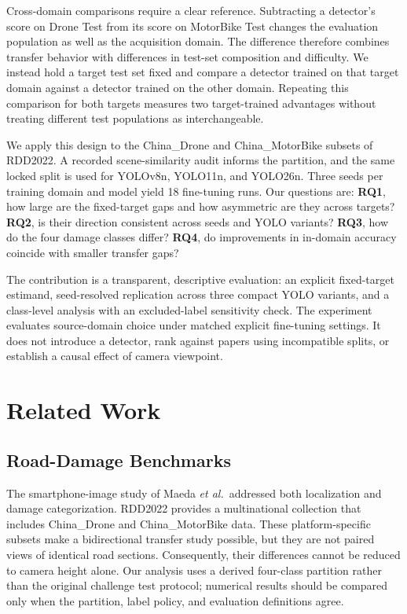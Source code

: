 \documentclass[conference,a4paper]{IEEEtran}
\begin{document}
Cross-domain comparisons require a clear reference. Subtracting a detector's score on Drone Test from its score on MotorBike Test changes the evaluation population as well as the acquisition domain. The difference therefore combines transfer behavior with differences in test-set composition and difficulty. We instead hold a target test set fixed and compare a detector trained on that target domain against a detector trained on the other domain. Repeating this comparison for both targets measures two target-trained advantages without treating different test populations as interchangeable.

We apply this design to the China\_Drone and China\_MotorBike subsets of RDD2022. A recorded scene-similarity audit informs the partition, and the same locked split is used for YOLOv8n, YOLO11n, and YOLO26n. Three seeds per training domain and model yield 18 fine-tuning runs. Our questions are: \textbf{RQ1}, how large are the fixed-target gaps and how asymmetric are they across targets? \textbf{RQ2}, is their direction consistent across seeds and YOLO variants? \textbf{RQ3}, how do the four damage classes differ? \textbf{RQ4}, do improvements in in-domain accuracy coincide with smaller transfer gaps?

The contribution is a transparent, descriptive evaluation: an explicit fixed-target estimand, seed-resolved replication across three compact YOLO variants, and a class-level analysis with an excluded-label sensitivity check. The experiment evaluates source-domain choice under matched explicit fine-tuning settings. It does not introduce a detector, rank against papers using incompatible splits, or establish a causal effect of camera viewpoint.

\section{Related Work}
\subsection{Road-Damage Benchmarks}
The smartphone-image study of Maeda \emph{et al.}\ addressed both localization and damage categorization\cite{maeda2018road}. RDD2022 provides a multinational collection that includes China\_Drone and China\_MotorBike data\cite{arya2024rdd2022}. These platform-specific subsets make a bidirectional transfer study possible, but they are not paired views of identical road sections. Consequently, their differences cannot be reduced to camera height alone. Our analysis uses a derived four-class partition rather than the original challenge test protocol; numerical results should be compared only when the partition, label policy, and evaluation definitions agree.
\end{document}
